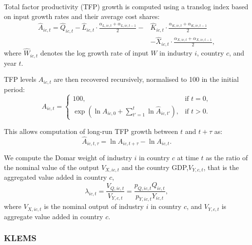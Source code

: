 \documentclass[11pt]{article}
\begin{document}
\noindent
Total factor productivity (TFP) growth is computed using a translog index based on input growth rates and their average cost shares:
\begin{equation}
\label{eq_tfp_translog}
\begin{aligned}
    \hat{A}_{ic,t} =
     \hat{Q}_{ic,t} -
     \hat{L}_{ic,t} \cdot \frac{\alpha_{L,ic,t} + \alpha_{L,ic,t-1}}{2} -&
    \hat{K}_{ic,t} \cdot \frac{\alpha_{K,ic,t} + \alpha_{K,ic,t-1}}{2} \\&-
     \hat{X}_{ic,t} \cdot \frac{\alpha_{X,ic,t} + \alpha_{X,ic,t-1}}{2},
\end{aligned}
\end{equation}
\noindent
where $\hat{W}_{ic,t}$ denotes the log growth rate of input $W$ in industry $i$, country $c$, and year $t$.

\noindent
TFP levels $A_{ic,t}$ are then recovered recursively, normalised to 100 in the initial period:
\begin{equation}
    A_{ic,t} =
    \begin{cases}
        100, & \text{if } t=0, \\
        \exp\left( \ln A_{ic,0} + \sum_{t'=1}^{t} \ln \hat{A}_{ic,t'} \right), & \text{if } t > 0.
    \end{cases}
\end{equation}

\noindent
This allows computation of long-run TFP growth between $t$ and $t{+}\tau$ as:
\begin{equation}
    \hat{A}_{ic,t,\tau} = \ln A_{ic,t+\tau} - \ln A_{ic,t}.
\end{equation}

\noindent
We compute the Domar weight of industry $i$ in country $c$ at time $t$ as the ratio of the nominal value of the output $V_{X,ic,t}$  and the country GDP,$V_{Y,c,t}$, that is the aggregated value added in country $c$,
\begin{equation}
    \lambda_{ic,t} = \frac{V_{Q,ic,t}}{V_{Y,c,t}}= \frac{p_{Q,ic,t}Q_{ic,t}}{p_{Y,ic,t}Y_{ic,t}},
    \label{eq:lambdajct}
\end{equation}
\noindent
where $V_{X,ic,t}$ is the nominal output of industry $i$ in country $c$, and $V_{Y,c,t}$ is aggregate value added in country $c$.

\subsubsection{KLEMS}
\end{document}

